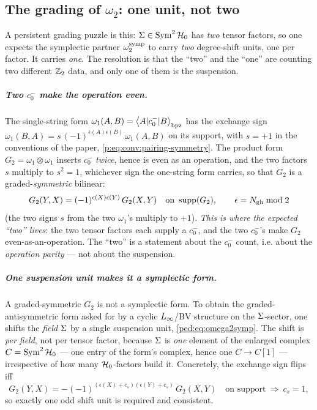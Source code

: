 \subsection{The grading of \texorpdfstring{$\omega_2$}{omega-2}: one unit, not two}
\label{ped:sec:omega2}

A persistent grading puzzle is this: $\Sigma\in\operatorname{Sym}^2\mathcal{H}_0$ has
\emph{two} tensor factors, so one expects the symplectic partner $\omega_2^{\rm symp}$ to
carry \emph{two} degree-shift units, one per factor. It carries \emph{one}. The resolution
is that the \enquote{two} and the \enquote{one} are counting two
different $\mathbb{Z}_2$ data, and only one of them is the suspension.

\subparagraph{Two $c_0^-$ make the operation even.} The single-string form
$\omega_1(A,B)=\left \langle A|c_0^-|B \right \rangle_{\rm bpz}$ has the exchange sign $\omega_1(B,A)=s\,(-1)^{\epsilon(A)\epsilon(B)}\,\omega_1(A,B)$ on its support, with $s=+1$ in the conventions of the paper, \eqref{p:eq:conv:pairing-symmetry}. The product form
$G_2=\omega_1\otimes\omega_1$ inserts $c_0^-$ \emph{twice}, hence is even as an operation, and
the two factors $s$ multiply to $s^2=1$, whichever sign the one-string form carries, so that $G_2$ is a graded-\emph{symmetric} bilinear:
\begin{equation}
	G_2(Y,X)=(-1)^{\epsilon(X)\epsilon(Y)}\,G_2(X,Y)
	\quad\text{on }\operatorname{supp}(G_2),
	\qquad \epsilon=N_{\text{gh}}\bmod2
	\label{ped:eq:G2sym}
\end{equation}
(the two signs $s$ from the two $\omega_1$'s multiply to $+1$). \emph{This is
where the expected \enquote{two} lives}: the two tensor factors each supply a $c_0^-$, and the two
$c_0^-$'s make $G_2$ even-as-an-operation. The \enquote{two} is a
statement about the $c_0^-$ count, i.e. about the \emph{operation parity} --- not about the
suspension.

\subparagraph{One suspension unit makes it a symplectic form.} A graded-symmetric $G_2$ is not a
symplectic form. To obtain the graded-antisymmetric form asked for by a cyclic
$L_\infty$/BV structure on the $\Sigma$-sector, one shifts the \emph{field} $\Sigma$ by a single
suspension unit, \eqref{ped:eq:omega2symp}. The shift is \emph{per field}, not per tensor factor,
because $\Sigma$ is \emph{one} element of the enlarged complex $C=\operatorname{Sym}^2\mathcal{H}_0$ --- one entry
of the form's complex, hence one $C\to C[1]$ --- irrespective of how many $\mathcal{H}_0$-factors
build it. Concretely, the exchange sign flips iff
\begin{equation}
	G_2(Y,X)=-(-1)^{(\epsilon(X)+c_s)(\epsilon(Y)+c_s)}\,G_2(X,Y)
	\quad\text{on support}
	\ \Longrightarrow\ c_s=1,
	\label{ped:eq:cs}
\end{equation}
so exactly one odd shift unit is required and consistent.

